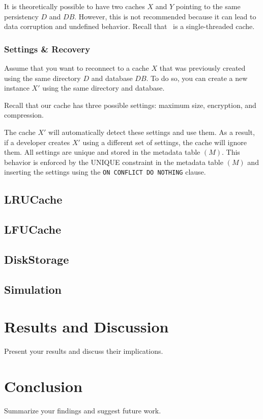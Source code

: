 \documentclass[11pt, journal]{IEEEtran}
\begin{document}
\begin{tcolorbox}[colback=blue!5!white, colframe=blue!75!black, title=Note]
    It is theoretically possible to have two caches $X$ and $Y$ pointing
    to the same persistency $D$ and $DB$. However, this is not recommended
    because it can lead to data corruption and undefined behavior.
    Recall that \sqlitecache~is a single-threaded cache.
\end{tcolorbox}

\subsubsection{Settings \& Recovery}
Assume that you want to reconnect to a cache $X$ that was previously
created using the same directory $D$ and database $DB$. To do so, you can
create a new instance $X'$ using the same directory and database.

Recall that our cache has three possible settings: maximum size, encryption, and compression.

The cache $X'$ will automatically detect these settings and use them. As a result,
if a developer creates $X'$ using a different set of settings, the cache will
ignore them. All settings are unique and stored
in the metadata table $(M)$. This behavior is enforced by the UNIQUE
constraint in the metadata table $(M)$ and inserting
the settings using the \texttt{ON CONFLICT DO NOTHING} clause.

\subsection{LRUCache\label{sec:lru}}
\subsection{LFUCache\label{sec:lfu}}

\subsection{DiskStorage}

\subsection{Simulation\label{sec:simulation}}

\section{Results and Discussion}
Present your results and discuss their implications.

\section{Conclusion}
Summarize your findings and suggest future work.



\end{document}
